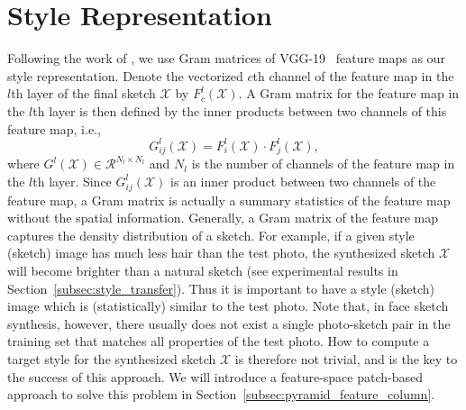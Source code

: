 \documentclass[10pt,twocolumn,letterpaper]{article}
\begin{document}
\section{Style Representation}\label{sec:motivation}
Following the work of \cite{gatys2015neural}, we use Gram matrices of VGG-19~\cite{simonyan2014very} feature maps as our style representation. Denote the vectorized $c$th channel of the feature map in the $l$th layer of the final sketch $\mathcal{X}$ by $F^{l}_{c}(\mathcal{X})$. A Gram matrix for the feature map in the $l$th layer is then defined by the inner products between two channels of this feature map, i.e.,
\begin{equation}
G^l_{ij}(\mathcal{X}) = F^l_{i}(\mathcal{X}) \cdot F^l_{j}(\mathcal{X}), %
\label{eq:Gram_element}
\end{equation}
where $G^l(\mathcal{X}) \in {\mathcal{R}^{N_l \times N_l}}$ %
and $N_l$ is the number of channels of the feature map in the $l$th layer. Since $G^l_{ij}(\mathcal{X})$ is an inner product between two channels of the feature map, a Gram matrix is actually a summary statistics of the feature map without the spatial information. Generally, a Gram matrix of the feature map captures the density distribution of a sketch. For example, if a given style (sketch) image has much less hair than the test photo, the synthesized sketch $\mathcal{X}$ will become brighter than a natural sketch (see experimental results in Section~\ref{subsec:style_transfer}). Thus it is important to have a style (sketch) image which is (statistically) similar to the test photo. Note that, in face sketch synthesis, however, there usually does not exist a single photo-sketch pair in the training set that matches all properties of the test photo. How to compute a target style for the synthesized sketch $\mathcal{X}$ is therefore not trivial, and is the key to the success of this approach. We will introduce a feature-space patch-based approach to solve this problem in Section~\ref{subsec:pyramid_feature_column}.

\end{document}
